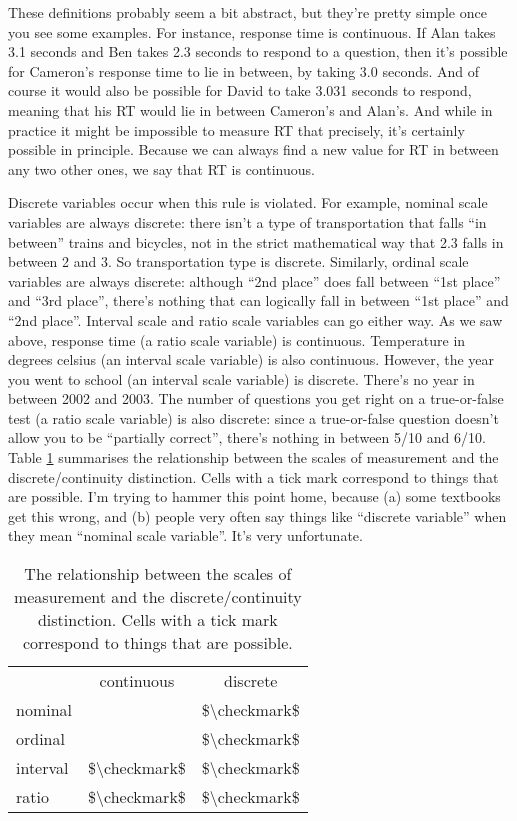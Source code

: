 \documentclass[]{book}
\begin{document}
These definitions probably seem a bit abstract, but they're pretty simple once you see some examples. For instance, response time is continuous. If Alan takes 3.1 seconds and Ben takes 2.3 seconds to respond to a question, then it's possible for Cameron's response time to lie in between, by taking 3.0 seconds. And of course it would also be possible for David to take 3.031 seconds to respond, meaning that his RT would lie in between Cameron's and Alan's. And while in practice it might be impossible to measure RT that precisely, it's certainly possible in principle. Because we can always find a new value for RT in between any two other ones, we say that RT is continuous.

Discrete variables occur when this rule is violated. For example, nominal scale variables are always discrete: there isn't a type of transportation that falls ``in between'' trains and bicycles, not in the strict mathematical way that 2.3 falls in between 2 and 3. So transportation type is discrete. Similarly, ordinal scale variables are always discrete: although ``2nd place'' does fall between ``1st place'' and ``3rd place'', there's nothing that can logically fall in between ``1st place'' and ``2nd place''. Interval scale and ratio scale variables can go either way. As we saw above, response time (a ratio scale variable) is continuous. Temperature in degrees celsius (an interval scale variable) is also continuous. However, the year you went to school (an interval scale variable) is discrete. There's no year in between 2002 and 2003. The number of questions you get right on a true-or-false test (a ratio scale variable) is also discrete: since a true-or-false question doesn't allow you to be ``partially correct'', there's nothing in between 5/10 and 6/10. Table \ref{tab:scalescont} summarises the relationship between the scales of measurement and the discrete/continuity distinction. Cells with a tick mark correspond to things that are possible. I'm trying to hammer this point home, because (a) some textbooks get this wrong, and (b) people very often say things like ``discrete variable'' when they mean ``nominal scale variable''. It's very unfortunate.

\begin{table}

\caption{\label{tab:scalescont}The relationship between the scales of measurement and the discrete/continuity distinction. Cells with a tick mark correspond to things that are possible.}
\centering
\begin{tabular}[t]{lcc}
\toprule
 & continuous & discrete\\
nominal &  & \$\textbackslash{}checkmark\$\\
ordinal &  & \$\textbackslash{}checkmark\$\\
interval & \$\textbackslash{}checkmark\$ & \$\textbackslash{}checkmark\$\\
ratio & \$\textbackslash{}checkmark\$ & \$\textbackslash{}checkmark\$\\
\bottomrule
\end{tabular}
\end{table}
\end{document}
